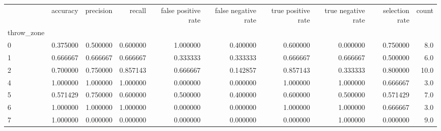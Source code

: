 \begin{tabular}{lrrrrrrrrr}
\toprule
{} &  accuracy &  precision &    recall &  false positive rate &  false negative rate &  true positive rate &  true negative rate &  selection rate &  count \\
throw\_zone &           &            &           &                      &                      &                     &                     &                 &        \\
\midrule
0          &  0.375000 &   0.500000 &  0.600000 &             1.000000 &             0.400000 &            0.600000 &            0.000000 &        0.750000 &    8.0 \\
1          &  0.666667 &   0.666667 &  0.666667 &             0.333333 &             0.333333 &            0.666667 &            0.666667 &        0.500000 &    6.0 \\
2          &  0.700000 &   0.750000 &  0.857143 &             0.666667 &             0.142857 &            0.857143 &            0.333333 &        0.800000 &   10.0 \\
4          &  1.000000 &   1.000000 &  1.000000 &             0.000000 &             0.000000 &            1.000000 &            1.000000 &        0.666667 &    3.0 \\
5          &  0.571429 &   0.750000 &  0.600000 &             0.500000 &             0.400000 &            0.600000 &            0.500000 &        0.571429 &    7.0 \\
6          &  1.000000 &   1.000000 &  1.000000 &             0.000000 &             0.000000 &            1.000000 &            1.000000 &        0.666667 &    3.0 \\
7          &  1.000000 &   0.000000 &  0.000000 &             0.000000 &             0.000000 &            0.000000 &            1.000000 &        0.000000 &    9.0 \\
\bottomrule
\end{tabular}
